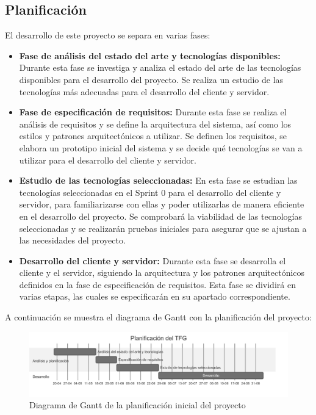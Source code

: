 \subsection{Planificación}
El desarrollo de este proyecto se separa en varias fases:
\begin{itemize}
    \item \textbf{Fase de análisis del estado del arte y tecnologías disponibles:} Durante esta fase se investiga y analiza el estado del arte de las tecnologías disponibles para el desarrollo del proyecto. Se realiza un estudio de las tecnologías más adecuadas para el desarrollo del cliente y servidor.
    \item \textbf{Fase de especificación de requisitos:} Durante esta fase se realiza el análisis de requisitos y se define la arquitectura del sistema, así como los estilos y patrones arquitectónicos a utilizar. Se definen los requisitos, se elabora un prototipo inicial del sistema y se decide qué tecnologías se van a utilizar para el desarrollo del cliente y servidor.
    \item \textbf{Estudio de las tecnologías seleccionadas:} En esta fase se estudian las tecnologías seleccionadas en el Sprint 0 para el desarrollo del cliente y servidor, para familiarizarse con ellas y poder utilizarlas de manera eficiente en el desarrollo del proyecto. Se comprobará la viabilidad de las tecnologías seleccionadas y se realizarán pruebas iniciales para asegurar que se ajustan a las necesidades del proyecto.
    \item \textbf{Desarrollo del cliente y servidor:} Durante esta fase se desarrolla el cliente y el servidor, siguiendo la arquitectura y los patrones arquitectónicos definidos en la fase de especificación de requisitos. Esta fase se dividirá en varias etapas, las cuales se especificarán en su apartado correspondiente.
\end{itemize}

A continuación se muestra el diagrama de Gantt con la planificación del proyecto:
\begin{figure}[H]
    \begin{center}
        \includegraphics[width=\textwidth]{assets/planificacion-inicial.png}
    \end{center}
    \caption{Diagrama de Gantt de la planificación inicial del proyecto}\label{fig:planificacion-inicial}
\end{figure}


